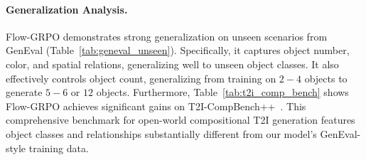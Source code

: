\paragraph{Generalization Analysis.}
Flow-GRPO demonstrates strong generalization on unseen scenarios from GenEval (Table~\ref{tab:geneval_unseen}). Specifically, it captures object number, color, and spatial relations, generalizing well to unseen object classes. It also effectively controls object count, generalizing from training on $2-4$ objects to generate $5-6$ or $12$ objects. Furthermore, Table~\ref{tab:t2i_comp_bench} shows Flow-GRPO achieves significant gains on T2I-CompBench++~\cite{T2i-compbench, huang2025t2i}. This comprehensive benchmark for open-world compositional T2I generation features object classes and relationships substantially different from our model's GenEval-style training data.


